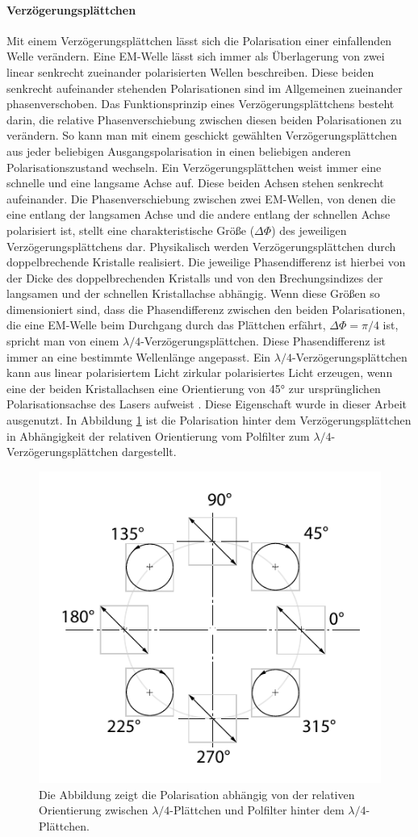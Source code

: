 \documentclass[titlepage,  ngerman]{article}
\begin{document}
	\paragraph{Verzögerungsplättchen}
	Mit einem Verzögerungsplättchen lässt sich die Polarisation einer einfallenden Welle verändern. Eine EM-Welle lässt sich immer als Überlagerung von zwei linear senkrecht zueinander polarisierten Wellen beschreiben. Diese beiden senkrecht aufeinander stehenden Polarisationen sind im Allgemeinen zueinander phasenverschoben. Das Funktionsprinzip eines Verzögerungsplättchens besteht darin, die relative Phasenverschiebung zwischen diesen beiden Polarisationen zu verändern. So kann man mit einem geschickt gewählten Verzögerungsplättchen aus jeder beliebigen Ausgangspolarisation in einen beliebigen anderen Polarisationszustand wechseln. Ein Verzögerungsplättchen weist immer eine schnelle und eine langsame Achse auf. Diese beiden Achsen stehen senkrecht aufeinander. Die Phasenverschiebung zwischen zwei EM-Wellen, von denen die eine entlang der langsamen Achse und die andere entlang der schnellen Achse polarisiert ist, stellt eine charakteristische Größe ($\Delta\Phi$) des jeweiligen Verzögerungsplättchens dar. Physikalisch  werden Verzögerungsplättchen durch doppelbrechende Kristalle realisiert. Die jeweilige Phasendifferenz ist hierbei von der Dicke des doppelbrechenden Kristalls und von den Brechungsindizes der langsamen und der schnellen Kristallachse abhängig. Wenn diese Größen so dimensioniert sind, dass die Phasendifferenz zwischen den beiden Polarisationen, die eine EM-Welle beim Durchgang durch das Plättchen erfährt, $\Delta \Phi = \pi /4 $ ist, spricht man von einem  $\lambda /4$-Verzögerungsplättchen. Diese Phasendifferenz ist immer an eine bestimmte Wellenlänge angepasst.  Ein $\lambda /4$-Verzögerungsplättchen kann aus linear polarisiertem Licht zirkular polarisiertes Licht erzeugen, wenn eine der beiden Kristallachsen eine Orientierung von 45° zur ursprünglichen Polarisationsachse des Lasers aufweist \cite{Hecht.2018}. Diese Eigenschaft wurde in dieser Arbeit ausgenutzt. In Abbildung \ref{fig:polarisationlambda} ist die Polarisation hinter dem Verzögerungsplättchen in Abhängigkeit der relativen Orientierung vom Polfilter zum $\lambda /4$-Verzögerungsplättchen dargestellt. 
	\begin{figure}
		\centering
		\includegraphics[width=0.5\linewidth]{figures/Polarisation_lambda}
		\caption[Polarisation $\lambda/4$-Plättchen]{Die Abbildung zeigt die Polarisation abhängig von der relativen Orientierung zwischen $\lambda/4$-Plättchen und Polfilter hinter dem $\lambda/4$-Plättchen.}
		\label{fig:polarisationlambda}
	\end{figure}
	
\end{document}
